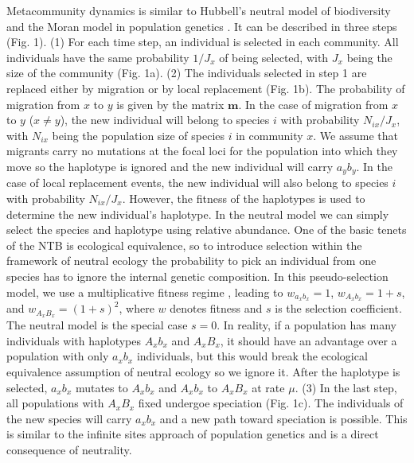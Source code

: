 \documentclass[letterpaper,twocolumn,superscriptaddress,showkeys]{revtex4}
\begin{document}
Metacommunity dynamics is similar to Hubbell's neutral model of biodiversity \cite{hub01} and the Moran model in population genetics \cite{mor62,ewe04}. It can be described in three steps (Fig. 1). (1) For each time step, an individual is selected in each community. All individuals have the same probability $1/J_x$ of being selected, with $J_x$ being the size of the community (Fig. 1a). (2) The individuals selected in step 1 are replaced either by migration or by local replacement (Fig. 1b). The probability of migration from $x$ to $y$ is given by the matrix $\mathbf{m}$. In the case of migration from $x$ to $y$ ($x \not = y$), the new individual will belong to species $i$ with probability $N_{ix}/J_x$, with $N_{ix}$ being the population size of species $i$ in community $x$. We assume that migrants carry no mutations at the focal loci for the population into which they move so the haplotype is ignored and the new individual will carry $a_yb_y$. In the case of local replacement events, the new individual will also belong to species $i$ with probability $N_{ix}/J_x$. However, the fitness of the haplotypes is used to determine the new individual's haplotype. In the neutral model we can simply select the species and haplotype using relative abundance. One of the basic tenets of the NTB is ecological equivalence, so to introduce selection within the framework of neutral ecology the probability to pick an individual from one species has to ignore the internal genetic composition. In this pseudo-selection model, we use a multiplicative fitness regime \cite[p. 166]{cha11}, leading to $w_{a_xb_x} = 1$, $w_{A_xb_x} = 1 + s$, and $w_{A_xB_x} = (1+s)^2$, where $w$ denotes fitness and $s$ is the selection coefficient. The neutral model is the special case $s = 0$. In reality, if a population has many individuals with haplotypes $A_xb_x$ and $A_xB_x$, it should have an advantage over a population with only $a_xb_x$ individuals, but this would break the ecological equivalence assumption of neutral ecology so we ignore it. After the haplotype is selected, $a_xb_x$ mutates to $A_xb_x$ and $A_xb_x$ to $A_xB_x$ at rate $\mu$. (3) In the last step, all populations with $A_xB_x$ fixed undergoe speciation (Fig. 1c). The individuals of the new species will carry $a_xb_x$ and a new path toward speciation is possible. This is similar to the infinite sites approach of population genetics \cite{cro70} and is a direct consequence of neutrality.
\end{document}

